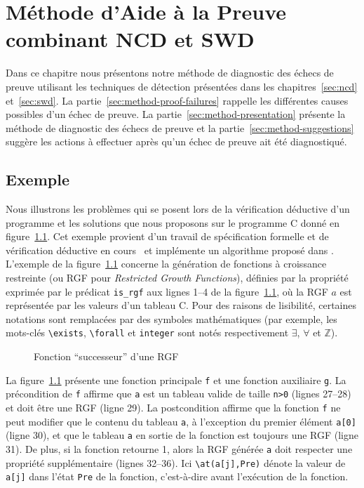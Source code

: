 
\chapter{Méthode d'Aide à la Preuve combinant NCD et SWD}
\label{sec:method}

\chapterintro


Dans ce chapitre nous présentons notre méthode de diagnostic des échecs de
preuve utilisant les techniques de détection présentées dans les
chapitres~\ref{sec:ncd} et~\ref{sec:swd}.
La partie~\ref{sec:method-proof-failures} rappelle les différentes causes
possibles d'un échec de preuve.
La partie~\ref{sec:method-presentation} présente la méthode de diagnostic des
échecs de preuve et la partie~\ref{sec:method-suggestions} suggère les actions
à effectuer après qu'un échec de preuve ait été diagnostiqué.


\section{Exemple}
\label{sec:method-ex}


Nous illustrons les problèmes qui se posent lors de la vérification déductive
d'un programme et les solutions que nous proposons sur le programme C donné en
figure~\ref{fig:rgf1}.
Cet exemple provient d'un travail de spécification formelle et de vérification
déductive en cours~\cite{Genestier/TAP15} et implémente un algorithme proposé
dans \cite[page 235]{Arndt/10}.
L'exemple de la figure~\ref{fig:rgf1} concerne la génération de fonctions à
croissance restreinte (ou RGF pour \textit{Restricted Growth Functions}),
définies par la propriété exprimée par le prédicat \acsl \lstinline{is_rgf} aux
lignes 1--4 de la figure~\ref{fig:rgf1}, où la RGF $a$ est représentée par les
valeurs d'un tableau C.
Pour des raisons de lisibilité, certaines notations \acsl sont remplacées par
des symboles mathématiques (par exemple, les mots-clés
\lstinline[style=c]{\exists}, \lstinline[style=c]{\forall} et
\lstinline[style=c]{integer} sont notés respectivement $\exists$, $\forall$ et
$\mathbb{Z}$).


\begin{figure}[tb]
  \centering
  
  \caption{Fonction ``successeur'' d'une RGF \label{fig:rgf1}}
\end{figure}


La figure~\ref{fig:rgf1} présente une fonction principale \lstinline{f} et une
fonction auxiliaire \lstinline{g}.
La précondition de \lstinline{f} affirme que \lstinline{a} est un tableau
valide de taille \lstinline{n>0} (lignes 27--28) et doit être une RGF
(ligne 29).
La postcondition affirme que la fonction \lstinline'f' ne peut modifier que le
contenu du tableau \lstinline{a}, à l'exception du premier élément
\lstinline{a[0]} (ligne 30), et que le tableau \lstinline{a} en sortie de la
fonction est toujours une RGF (ligne 31).
De plus, si la fonction retourne 1, alors la RGF générée \lstinline{a} doit
respecter une propriété supplémentaire (lignes 32--36).
Ici \lstinline{\at(a[j],Pre)} dénote la valeur de \lstinline{a[j]} dans l'état 
\lstinline{Pre} de la fonction, c'est-à-dire avant l'exécution de la fonction.

